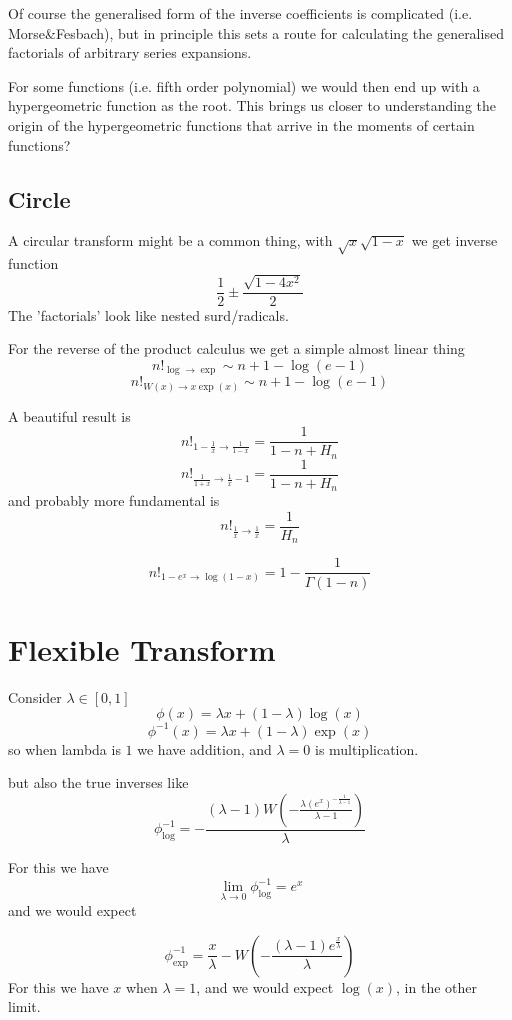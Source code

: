 \documentclass{article}
\begin{document}
Of course the generalised form of the inverse coefficients is complicated (i.e. Morse\&Fesbach), but in principle this sets a route for calculating the generalised factorials of arbitrary series expansions. 

For some functions (i.e. fifth order polynomial) we would then end up with a hypergeometric function as the root. This brings us closer to understanding the origin of the hypergeometric functions that arrive in the moments of certain functions? 

\subsection{Circle}
A circular transform might be a common thing, with $\sqrt{x} \sqrt{1-x}$ we get inverse function 
$$
\frac{1}{2} \pm \frac{\sqrt{1 - 4 x^2
}}{2}
$$
The 'factorials' look like nested surd/radicals.


For the reverse of the product calculus we get a simple almost linear thing
$$
n!_{\log \to \exp} \sim n + 1 - \log(e-1)
$$
$$
n!_{W(x) \to x\exp(x)} \sim n + 1 - \log(e-1)
$$

A beautiful result is 
$$
n!_{1-\frac{1}{x} \to \frac{1}{1-x}} = \frac{1}{1 - n + H_n}
$$
$$
n!_{\frac{1}{1+x} \to \frac{1}{x}-1 } = \frac{1}{1 -                                                                                   n + H_n}
$$
and probably more fundamental is 
$$
n!_{\frac{1}{x} \to \frac{1}{x}} = \frac{1}{H_n}
$$

$$
n!_{1-e^x \to \log(1-x)} = 1 - \frac{1}{\Gamma(1-n)}
$$

\section{Flexible Transform}
Consider $\lambda \in [0,1]$
$$
\phi(x) = \lambda x + (1-\lambda) \log(x)
$$
$$
\phi^{-1}(x) = \lambda x + (1-\lambda) \exp(x)
$$
so when lambda is $1$ we have addition, and $\lambda=0$ is multiplication.

but also the true inverses like
$$
\phi_{\log}^{-1} = -\frac{(\lambda -1) W\left(-\frac{\lambda  \left(e^x\right)^{-\frac{1}{\lambda -1}}}{\lambda -1}\right)}{\lambda }
$$

For this we have 
$$
\lim_{\lambda \to 0} \phi_{\log}^{-1} = e^x
$$
and we would expect 



$$
\phi_{\exp}^{-1} = \frac{x}{\lambda }-W\left(-\frac{(\lambda -1) e^{\frac{x}{\lambda }}}{\lambda }\right)
$$
For this we have $x$ when $\lambda = 1$, and we would expect $\log(x)$, in the other limit.
\end{document}
